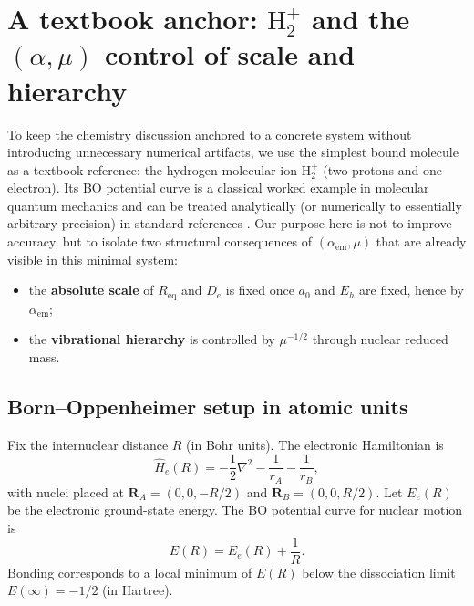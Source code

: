 \section{A textbook anchor: $\mathrm{H}_2^+$ and the \texorpdfstring{$(\alpha,\mu)$}{(alpha,mu)} control of scale and hierarchy}
\label{sec:h2plus}

To keep the chemistry discussion anchored to a concrete system without introducing unnecessary numerical artifacts, we use the simplest bound molecule as a textbook reference: the hydrogen molecular ion $\mathrm{H}_2^+$ (two protons and one electron). Its BO potential curve is a classical worked example in molecular quantum mechanics and can be treated analytically (or numerically to essentially arbitrary precision) in standard references \cite{PaulingWilson1935,AtkinsFriedman2011,SzaboOstlund1996}.
Our purpose here is not to improve accuracy, but to isolate two structural consequences of $(\alpha_{\mathrm{em}},\mu)$ that are already visible in this minimal system:
\begin{itemize}
\item the \textbf{absolute scale} of $R_{\mathrm{eq}}$ and $D_e$ is fixed once $a_0$ and $E_h$ are fixed, hence by $\alpha_{\mathrm{em}}$;
\item the \textbf{vibrational hierarchy} is controlled by $\mu^{-1/2}$ through nuclear reduced mass.
\end{itemize}

\subsection{Born--Oppenheimer setup in atomic units}
Fix the internuclear distance $R$ (in Bohr units). The electronic Hamiltonian is
\begin{equation}
\hat H_e(R)=-\frac12\nabla^2-\frac{1}{r_A}-\frac{1}{r_B},
\end{equation}
with nuclei placed at $\mathbf{R}_A=(0,0,-R/2)$ and $\mathbf{R}_B=(0,0,R/2)$. Let $E_e(R)$ be the electronic ground-state energy. The BO potential curve for nuclear motion is
\begin{equation}
E(R)=E_e(R)+\frac{1}{R}.
\end{equation}
Bonding corresponds to a local minimum of $E(R)$ below the dissociation limit $E(\infty)=-1/2$ (in Hartree).

